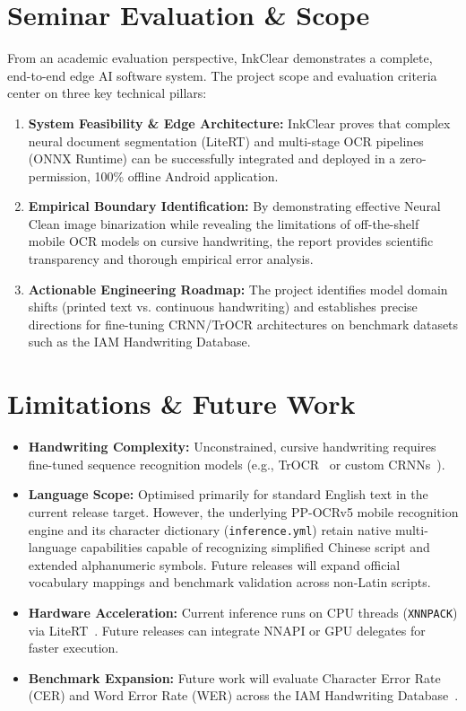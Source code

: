 \documentclass[11pt,a4paper]{article}
\begin{document}
\section{Seminar Evaluation \& Scope}

From an academic evaluation perspective, InkClear demonstrates a complete, end-to-end edge AI software system. The project scope and evaluation criteria center on three key technical pillars:
\begin{enumerate}[leftmargin=*]
  \item \textbf{System Feasibility \& Edge Architecture:} InkClear proves that complex neural document segmentation (LiteRT) and multi-stage OCR pipelines (ONNX Runtime) can be successfully integrated and deployed in a zero-permission, 100\% offline Android application.
  \item \textbf{Empirical Boundary Identification:} By demonstrating effective Neural Clean image binarization while revealing the limitations of off-the-shelf mobile OCR models on cursive handwriting, the report provides scientific transparency and thorough empirical error analysis.
  \item \textbf{Actionable Engineering Roadmap:} The project identifies model domain shifts (printed text vs. continuous handwriting) and establishes precise directions for fine-tuning CRNN/TrOCR architectures on benchmark datasets such as the IAM Handwriting Database.
\end{enumerate}

\section{Limitations \& Future Work}

\begin{itemize}[leftmargin=*]
  \item \textbf{Handwriting Complexity:} Unconstrained, cursive handwriting requires fine-tuned sequence recognition models (e.g., TrOCR~\cite{li2023trocr} or custom CRNNs~\cite{shi2016crnn}).
  \item \textbf{Language Scope:} Optimised primarily for standard English text in the current release target. However, the underlying PP-OCRv5 mobile recognition engine and its character dictionary (\texttt{inference.yml}) retain native multi-language capabilities capable of recognizing simplified Chinese script and extended alphanumeric symbols. Future releases will expand official vocabulary mappings and benchmark validation across non-Latin scripts.
  \item \textbf{Hardware Acceleration:} Current inference runs on CPU threads (\texttt{XNNPACK}) via LiteRT~\cite{david2021tflite}. Future releases can integrate NNAPI or GPU delegates for faster execution. 
  \item \textbf{Benchmark Expansion:} Future work will evaluate Character Error Rate (CER) and Word Error Rate (WER) across the IAM Handwriting Database~\cite{marti2002iam}.
\end{itemize}
\end{document}

